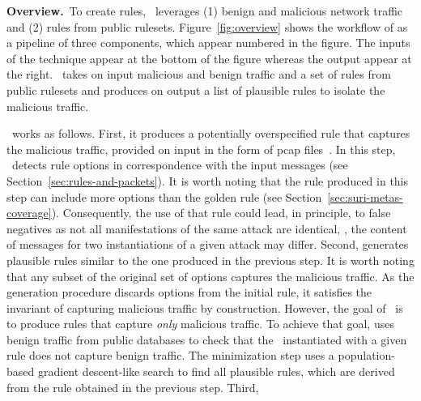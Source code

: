 \documentclass[sigconf,anonymous]{acmart}
\begin{document}
\vspace{1ex}
\noindent\textbf{Overview.}~To create rules, \tname\ leverages (1)
benign and malicious network traffic and (2) rules from public
rulesets. Figure~\ref{fig:overview} shows the workflow of \tname{} as
a pipeline of three components, which appear numbered in the figure.
The inputs of the technique appear at the bottom of the figure whereas
the output appear at the right. \tname\ takes on input malicious and
benign traffic and a set of rules from public rulesets and produces on
output a list of plausible rules to isolate the malicious traffic.

\tname\ works as follows. First, it produces a potentially
overspecified rule that captures the malicious traffic, provided on
input in the form of pcap files~\cite{pcap}. In this step,
\tname\ detects rule options in correspondence with the input messages
(see Section~\ref{sec:rules-and-packets}). It is worth noting that the
rule produced in this step can include more options than the golden
rule (see Section~\ref{sec:suri-metas-coverage}). Consequently, the
use of that rule could lead, in principle, to false negatives as not
all manifestations of the same attack are identical, \ie{}, the
content of messages for two instantiations of a given attack may
differ. Second, \tname{} generates plausible rules similar to the one
produced in the previous step. It is worth noting that any subset of
the original set of options captures the malicious traffic. As the
generation procedure discards options from the initial rule, it
satisfies the invariant of capturing malicious traffic by
construction. However, the goal of \tname\ is to produce rules that
capture \emph{only} malicious traffic. To achieve that goal, \tname{}
uses benign traffic from public databases to check that the
\nids\ instantiated with a given rule does not capture benign
traffic. The minimization step uses a population-based gradient
descent-like search to find all plausible rules, which are derived
from the rule obtained in the previous step. Third,



\end{document}
